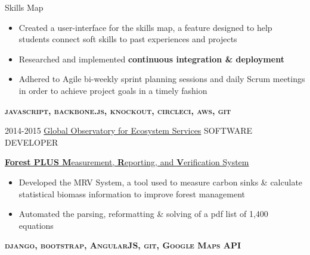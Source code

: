 \documentclass[]{friggeri-cv}
\begin{document}
\begin{entrylist}
{    Skills Map
    \begin{itemize}[topsep=0pt,leftmargin=0pt,itemsep=6pt]
      \item Created a user-interface for the skills map, a feature designed
        to help students connect soft skills to past experiences and projects
      \item {
          Researched and implemented {\bfseries continuous integration \& deployment} %
        }
      \item Adhered to Agile bi-weekly sprint planning sessions and daily 
        Scrum meetings in order to achieve project goals in a timely fashion
    \end{itemize}
    \textbf{\textsc{javascript, backbone.js, knockout, circleci, aws, git}}
    \vspace{10pt}
  }

  \entry
    {2014-2015}
    {
        \textcolor{gray}{\FA \faGlobe} \hspace{2pt}
        \href{http://www.canr.msu.edu/for/programs/goes}
        {Global Observatory for Ecosystem Services}
    }
    {SOFTWARE DEVELOPER}
    {
      \textcolor{gray}{\FA \faLeaf} \hspace{2pt} 
      \href{http://www.forestplus.org/}{{\bf Forest PLUS M}easurement, 
      {\bf R}eporting, and {\bf V}erification System }
        
      \begin{itemize}[topsep=0pt,leftmargin=0pt,itemsep=6pt]
          \item{
              Developed the MRV System, a tool used to measure carbon sinks
              \& calculate statistical biomass information to improve forest 
              management
          }
          \item{
              Automated the parsing, reformatting \& solving of a pdf list of 
              1,400 equations
          }
      \end{itemize}
      \textbf{\textsc{django, bootstrap, AngularJS, git, Google Maps API}}
     \vspace{10pt}
    }


\end{entrylist}
\end{document}
